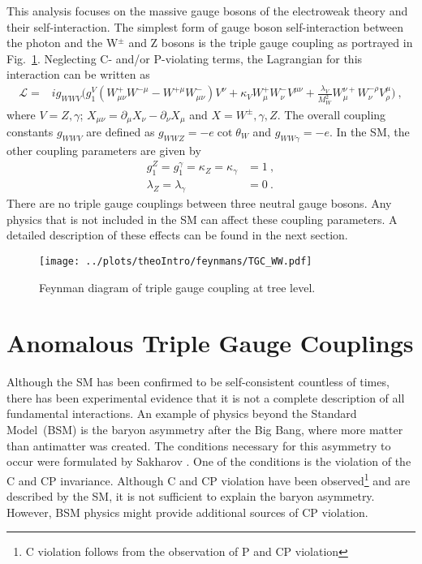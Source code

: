 \noindent This analysis focuses on the massive gauge bosons of the electroweak theory and their self-interaction. The simplest form of gauge boson self-interaction between  the photon and the W$^\pm$ and Z bosons is the triple gauge coupling as portrayed in Fig.~\ref{fig:theo:tgc}. Neglecting C- and/or P-violating terms, the Lagrangian for this interaction can be written as \cite{EFT}
\begin{align}
\mathcal{L} =& ig_{WWV}\Big( g_1^V(W_{\mu\nu}^+W^{-\mu} - W^{+\mu}W_{\mu\nu}^-)V^{\nu} + \kappa_VW_\mu^+W_\nu^-V^{\mu\nu}  + \frac{\lambda_V}{M_W^2}W_\mu^{\nu+}W_\nu^{-\rho}V_\rho^\mu  \Big) ~, \label{eq:theo:EWKlag}
\end{align}
where $V=Z,\gamma$; $X_{\mu\nu}=\partial_\mu X_\nu -\partial_\nu X_\mu$ and $X=W^\pm,\gamma ,Z$. The overall coupling constants $g_{WWV}$ are defined as $g_{WWZ} = -e \cot \theta_W$ and $g_{WW\gamma} =-e$. In the SM, the other coupling parameters are given by
\begin{align}
g_1^Z = g_1^\gamma = \kappa_Z = \kappa_\gamma &= 1 ~, \\
\lambda_Z = \lambda_\gamma &= 0 ~.
\end{align}
There are no triple gauge couplings between three neutral gauge bosons.
Any physics that is not included in the SM can affect these coupling parameters. A detailed description of these effects can be found in the next section.
\begin{figure}
	\centering
	\texttt{[image: ../plots/theoIntro/feynmans/TGC\_WW.pdf]}
	\caption[Feynman diagram of triple gauge coupling at tree level]{Feynman diagram of triple gauge coupling at tree level.}
	\label{fig:theo:tgc}
\end{figure}

\section{Anomalous Triple Gauge Couplings}
\label{sec:aTGC}
Although the SM has been confirmed to be self-consistent countless of times, there has been experimental evidence that it is not a complete description of all fundamental interactions. An example of physics beyond the Standard Model~(BSM) is the baryon asymmetry after the Big Bang, where more matter than antimatter was created. The conditions necessary for this asymmetry to occur were formulated by Sakharov \cite{sakharov}. One of the conditions is the violation of the C and CP invariance. Although C and CP violation have been observed\footnote{C violation follows from the observation of P \cite{wu} and CP violation}\cite{CP} and are described by the SM, it is not sufficient to explain the baryon asymmetry. However, BSM physics might provide additional sources of CP violation.\\

